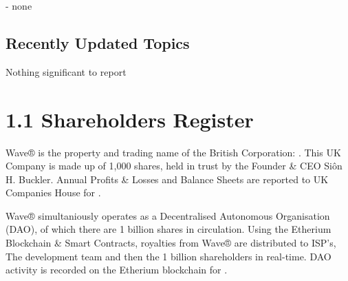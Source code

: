 \documentclass[letterpaper,10pt,english]{sphinxmanual}
\begin{document}
 - none


\subsection{Recently Updated Topics}
\label{\detokenize{releasenotes:recently-updated-topics}}
Nothing significant to report


\section{1.1 Shareholders Register}
\label{\detokenize{investors:shareholders-register}}\label{\detokenize{investors::doc}}
Wave® is the property and trading name of the British Corporation: .
This UK Company is made up of 1,000 shares, held in trust by the Founder \& CEO Siôn H. Buckler.
Annual Profits \& Losses and Balance Sheets are reported to UK Companies House for  .

Wave® simultaniously operates as a Decentralised Autonomous Organisation (DAO), of which there are 1 billion shares in circulation.
Using the Etherium Blockchain \& Smart Contracts, royalties from Wave® are distributed to ISP’s, The development team and then the 1 billion shareholders in real-time. DAO activity is recorded on the Etherium blockchain for .
\end{document}

